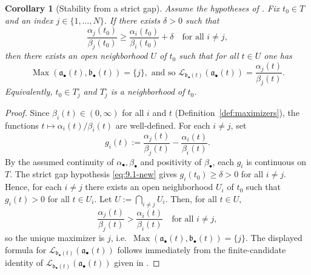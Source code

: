 \documentclass[12pt]{amsart}
\renewcommand{\a}{\mathfrak{a}}
\renewcommand{\b}{\mathfrak{b}}
\newcommand{\Loj}{\mathcal{L}} %
\DeclareMathOperator{\Max}{Max}
\newcommand{\abul}{{\a_\bullet}}
\newcommand{\bbul}{{\b_\bullet}}
\theoremstyle{plain}
\newtheorem{corollary}[theorem]{Corollary}
\theoremstyle{definition}
\numberwithin{equation}{section}
\begin{document}
\begin{corollary}[Stability from a strict gap]\label{cor:strict-separation}
	Assume the hypotheses of . Fix $t_0\in T$ and an index
	$j\in\{1,\dots,N\}$. If there exists $\delta>0$ such that
	\begin{equation}\label{eq:9.1-new}
		\frac{\alpha_j(t_0)}{\beta_j(t_0)} \ge \frac{\alpha_i(t_0)}{\beta_i(t_0)}+\delta
		\quad\text{for all }i\neq j,
	\end{equation}
	then there exists an open neighborhood $U$ of $t_0$ such that for all $t\in U$ one has
	\[
	\Max(\abul(t),\bbul(t))=\{j\},
	\text{ and so }
	\Loj_{\bbul(t)}(\abul(t))=\frac{\alpha_j(t)}{\beta_j(t)}.
	\]
	Equivalently, $t_0\in T_j^\circ$ and $T_j^\circ$ is a neighborhood of $t_0$.
\end{corollary}

\begin{proof}
	Since $\beta_i(t)\in(0,\infty)$ for all $i$ and $t$ (Definition~\ref{def:maximizers}), the functions
	$t\mapsto \alpha_i(t)/\beta_i(t)$ are well-defined. For each $i\neq j$, set
	\[
	g_i(t):=\frac{\alpha_j(t)}{\beta_j(t)}-\frac{\alpha_i(t)}{\beta_i(t)}.
	\]
	By the assumed continuity of $\alpha_\bullet,\beta_\bullet$ and positivity of $\beta_\bullet$,
	each $g_i$ is continuous on $T$. The strict gap hypothesis \eqref{eq:9.1-new} gives
	$g_i(t_0)\ge \delta>0$ for all $i\neq j$. Hence, for each $i\neq j$ there exists an open neighborhood
	$U_i$ of $t_0$ such that $g_i(t)>0$ for all $t\in U_i$. Let $U:=\bigcap_{i\neq j}U_i$.
	Then, for all $t\in U$,
	\[
	\frac{\alpha_j(t)}{\beta_j(t)}>\frac{\alpha_i(t)}{\beta_i(t)} \quad\text{for all }i\neq j,
	\]
	so the unique maximizer is $j$, i.e.\ $\Max(\abul(t),\bbul(t))=\{j\}$. The displayed formula for
	$\Loj_{\bbul(t)}(\abul(t))$ follows immediately from the finite-candidate identity of
	$\Loj_{\bbul(t)}(\abul(t))$ given in .
\end{proof}
\end{document}
